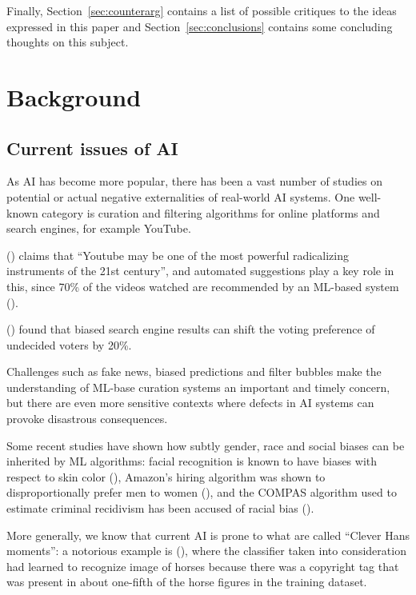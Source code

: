 \documentclass[conference]{IEEEtran}
\begin{document}
Finally, Section~\ref{sec:counterarg} contains a list of possible critiques to
the ideas expressed in this paper and Section~\ref{sec:conclusions} contains
some concluding thoughts on this subject.

\section{Background}
\label{sec:background}

\subsection{Current issues of AI}
\label{sec:opaque}

As AI has become more popular, there has been a vast number of studies on
potential or actual negative externalities of real-world AI systems. One
well-known category is curation and filtering algorithms for online platforms
and search engines, for example YouTube.

(\cite{tufekci2018youtube}) claims that ``Youtube may be one of the most powerful
radicalizing instruments of the 21st century'', and automated suggestions play a
key role in this, since 70\% of the videos watched are recommended by an
ML-based system  (\cite{solsman}).

(\cite{epstein}) found that biased search engine results can shift the voting
preference of undecided voters by 20\%.

Challenges such as fake news, biased predictions and filter bubbles make the
understanding of ML-base curation systems an important and timely concern, but
there are even more sensitive contexts where defects in AI systems can provoke
disastrous consequences.

Some recent studies have shown how subtly gender, race and social biases can be
inherited by ML algorithms: facial recognition is known to have biases with
respect to skin color (\cite{buolamwini2018gender}), Amazon's hiring algorithm
was shown to disproportionally prefer men to women (\cite{hiring}), and the
COMPAS algorithm used to estimate criminal recidivism has been accused of racial
bias (\cite{compas}).

More generally, we know that current AI is prone to what are called ``Clever
Hans moments'': a notorious example is (\cite{cleverhans}), where the classifier
taken into consideration had learned to recognize image of horses because there
was a copyright tag that was present in about one-fifth of the horse figures in
the training dataset.
\end{document}
